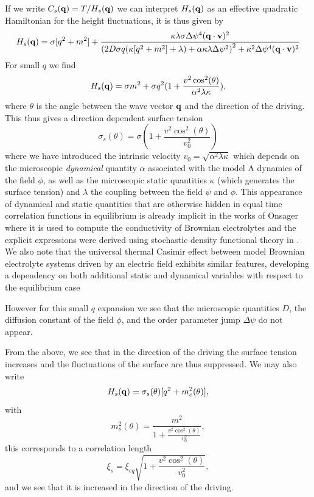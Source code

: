 If we write $C_s({\bf q})= T/H_s({\bf q})$ we can interpret $H_s({\bf q})$ as an effective quadratic Hamiltonian for the height fluctuations, it is thus given by
\begin{equation}
    H_s({\bf q}) = \sigma[q^2+m^2] + \frac{\kappa\lambda\sigma \Delta\psi^4 ({\bf q}\cdot{\bf v})^2}{\left(2 D\sigma q(\kappa[q^2+m^2]+\lambda)+\alpha\kappa\lambda\Delta\psi^2\right)^2 +\kappa^2 \Delta\psi^4 ({\bf q}\cdot{\bf v})^2}
\end{equation}
For small $q$ we find 
\begin{equation}
    H_s({\bf q}) = \sigma m^2 + \sigma q^2(1+ \frac{v^2\cos^2(\theta)}{\alpha^2\lambda\kappa}),
\end{equation}
where $\theta$ is the angle between the wave vector ${\bf q}$ and the direction of the driving. 
This thus gives a direction dependent surface tension 
\begin{equation}
    \sigma_s(\theta) = \sigma(1+ \frac{v^2\cos^2(\theta)}{v^2_0})
    \label{direction-surface-tension}
\end{equation}
where we have introduced the intrinsic velocity $v_0 = \sqrt{\alpha^2\lambda\kappa}$ which depends on the microscopic {\em dynamical} quantity $\alpha$ associated with the model A dynamics of the field $\phi$, as well as the microscopic static quantities $\kappa$ (which generates the surface tension) and $\lambda$ the coupling between the field $\psi$ and $\phi$. This appearance of dynamical and static quantities that are otherwise hidden in equal time correlation functions in equilibrium is already implicit in the works of Onsager \cite{onsager_collected_1996} where it is used to compute the conductivity of Brownian electrolytes and the explicit expressions were derived using stochastic density functional theory in \cite{demery_conductivity_2016}. We also note that the universal thermal Casimir effect between model Brownian electrolyte systems  driven by an electric field 
exhibits similar features, developing a dependency on both additional static and dynamical variables with respect to the equilibrium case \cite{dean_nonequilibrium_2016}


However for this small $q$ expansion we see that the microscopic 
quantities $D$, the diffusion constant of the field $\phi$, and the order parameter jump
$\Delta\psi$ do not appear. 

From the above, we see that  in the direction of the driving the surface tension increases and the fluctuations of the surface are thus suppressed. We may also write 
\begin{equation}
    H_s({\bf q}) = \sigma_s(\theta) [q^2 + m^2_e(\theta)],
\end{equation}
with 
\begin{equation}
    m^2_s(\theta) =\frac{ m^2}{1+ \frac{v^2\cos^2(\theta)}{v_0^2}},
\end{equation}
this corresponds to a correlation length 
\begin{equation}
    \xi_s = \xi_{eq}\sqrt{1+ \frac{v^2\cos^2(\theta)}{v_0^2}},
\end{equation}
and we see that it is increased in the direction of the driving. 

